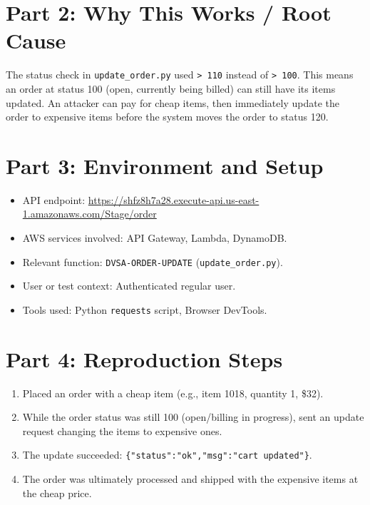 \documentclass[12pt]{report}
\begin{document}
\section{Part 2: Why This Works / Root Cause}
The status check in \texttt{update\_order.py} used \texttt{> 110} instead of \texttt{> 100}. This means an order at status 100 (open, currently being billed) can still have its items updated. An attacker can pay for cheap items, then immediately update the order to expensive items before the system moves the order to status 120.

\section{Part 3: Environment and Setup}
\begin{itemize}
  \item API endpoint: \url{https://shfz8h7a28.execute-api.us-east-1.amazonaws.com/Stage/order}
  \item AWS services involved: API Gateway, Lambda, DynamoDB.
  \item Relevant function: \texttt{DVSA-ORDER-UPDATE} (\texttt{update\_order.py}).
  \item User or test context: Authenticated regular user.
  \item Tools used: Python \texttt{requests} script, Browser DevTools.
\end{itemize}

\section{Part 4: Reproduction Steps}
\begin{enumerate}
  \item Placed an order with a cheap item (e.g., item 1018, quantity 1, \$32).
  \item While the order status was still 100 (open/billing in progress), sent an update request changing the items to expensive ones.
  \item The update succeeded: \texttt{\{"status":"ok","msg":"cart updated"\}}.
  \item The order was ultimately processed and shipped with the expensive items at the cheap price.
\end{enumerate}
\end{document}
